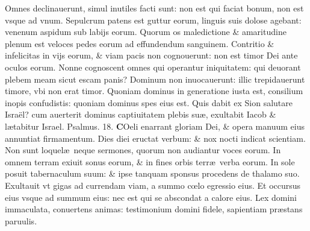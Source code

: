 \documentclass[a5paper,10pt]{book}
\def\ae{æ}
\def\oe{œ}
\begin{document}
\begin{multicols*}{2}
\newline \color{red} O\color{black}mnes declinauerunt, simul inutiles facti sunt: non est qui faciat bonum, non est vsque ad vnum.
\newline \color{red} S\color{black}epulcrum patens est guttur eorum, linguis suis dolose agebant: venenum aspidum sub labijs eorum.
\newline \color{red} Q\color{black}uorum os maledictione \& amaritudine plenum est veloces pedes eorum ad effundendum sanguinem.
\newline \color{red} C\color{black}ontritio \& infelicitas in vijs eorum, \& viam pacis non cognouerunt: non est timor Dei ante oculos eorum.
\newline \color{red} N\color{black}onne cognoscent omnes qui operantur iniquitatem: qui deuorant plebem meam sicut escam panis?
\newline \color{red} D\color{black}ominum non inuocauerunt: illic trepidauerunt timore, vbi non erat timor.
\newline \color{red} Q\color{black}uoniam dominus in generatione iusta est, consilium inopis confudistis: quoniam dominus spes eius est.
\newline \color{red} Q\color{black}uis dabit ex Sion salutare Israël? cum auerterit dominus captiuitatem plebis su\ae , exultabit Iacob \& l\ae tabitur Israel. \quad \color{red} Psalmus. \hypertarget{ps18}{18.} \color{black}
\vspace{-.5em}
\lettrine[lines=2]{\bfseries \color{red} C}{}Oeli enarrant gloriam Dei, \& opera manuum eius annuntiat firmamentum.
\newline \color{red} D\color{black}ies diei eructat verbum: \& nox nocti indicat scientiam.
\newline \color{red} N\color{black}on sunt loquel\ae \ neque sermones, quorum non audiantur voces eorum.
\newline \color{red} I\color{black}n omnem terram exiuit sonus eorum, \& in fines orbis terr\ae \ verba eorum.
\newline \color{red} I\color{black}n sole posuit tabernaculum suum: \& ipse tanquam sponsus procedens de thalamo suo.
\newline \color{red} E\color{black}xultauit vt gigas ad currendam viam, a summo c\oe lo egressio eius.
\newline \color{red} E\color{black}t occursus eius vsque ad summum eius: nec est qui se abscondat a calore eius.
\newline \color{red} L\color{black}ex domini immaculata, conuertens animas: testimonium domini fidele, sapientiam pr\ae stans paruulis.

\end{multicols*}
\end{document}
